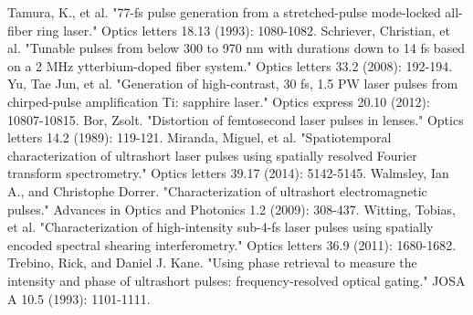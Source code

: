 \begin{thebibliography}{99}
 Tamura, K., et al. "77-fs pulse generation from a stretched-pulse mode-locked all-fiber ring laser." Optics letters 18.13 (1993): 1080-1082.
 Schriever, Christian, et al. "Tunable pulses from below 300 to 970 nm with durations down to 14 fs based on a 2 MHz ytterbium-doped fiber system." Optics letters 33.2 (2008): 192-194.
 Yu, Tae Jun, et al. "Generation of high-contrast, 30 fs, 1.5 PW laser pulses from chirped-pulse amplification Ti: sapphire laser." Optics express 20.10 (2012): 10807-10815.
 Bor, Zsolt. "Distortion of femtosecond laser pulses in lenses." Optics letters 14.2 (1989): 119-121.
 Miranda, Miguel, et al. "Spatiotemporal characterization of ultrashort laser pulses using spatially resolved Fourier transform spectrometry." Optics letters 39.17 (2014): 5142-5145.
 Walmsley, Ian A., and Christophe Dorrer. "Characterization of ultrashort electromagnetic pulses." Advances in Optics and Photonics 1.2 (2009): 308-437.
 Witting, Tobias, et al. "Characterization of high-intensity sub-4-fs laser pulses using spatially encoded spectral shearing interferometry." Optics letters 36.9 (2011): 1680-1682.
 Trebino, Rick, and Daniel J. Kane. "Using phase retrieval to measure the intensity and phase of ultrashort pulses: frequency-resolved optical gating." JOSA A 10.5 (1993): 1101-1111.


\end{thebibliography}